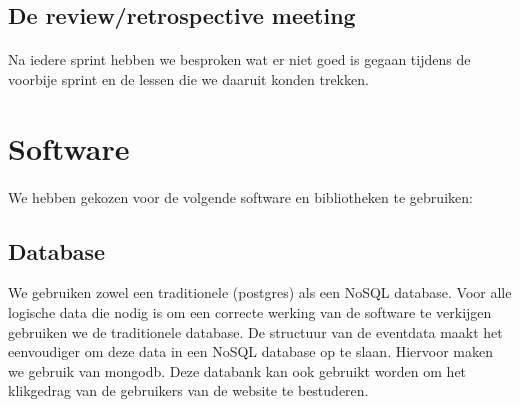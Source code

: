\documentclass[11pt,twoside,a4paper]{article}
\begin{document}
	\subsection{De review/retrospective meeting}
	
	\paragraph{}
	Na iedere sprint hebben we besproken wat er niet goed is gegaan tijdens de voorbije sprint en de lessen die we daaruit konden trekken.
	
	\section{Software}
	
	\paragraph{}	
	We hebben gekozen voor de volgende software en bibliotheken te gebruiken:
	
	\subsection{Database}
	
	We gebruiken zowel een traditionele (postgres) als een NoSQL database. Voor alle logische data die nodig is om een correcte werking van de software te verkijgen gebruiken we de traditionele database. De structuur van de eventdata maakt het eenvoudiger om deze data in een NoSQL database op te slaan. Hiervoor maken we gebruik van mongodb. Deze databank kan ook gebruikt worden om het klikgedrag van de gebruikers van de website te bestuderen.
	
\end{document}

